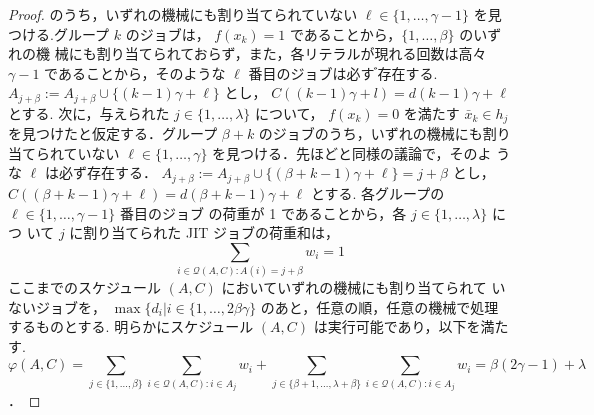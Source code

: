 \documentclass[12pt]{optlab-bachelor}
\begin{document}
\begin{proof}
  のうち，いずれの機械にも割り当てられていない $\ell \in
  \{1,\ldots,\gamma - 1\}$ を見つける.グループ $k$ のジョブは，
  $f (x_k) = 1$ であることから，$\{1,\ldots, \beta \}$ のいずれの機
  械にも割り当てられておらず，また，各リテラルが現れる回数は高々
  $\gamma − 1$ であることから，そのような $\ell$ 番目のジョブは必す
  ゙存在する. $A_{j + \beta} := A_{j + \beta} \cup \{ (k − 1) \gamma +
  \ell\}$ とし， $C((k − 1)\gamma + l) = d(k−1)\gamma + \ell$ とする.
  次に，与えられた $j \in \{1,\ldots,\lambda\}$ について， $f(x_k) = 0$
  を満たす $\bar x_k \in h_j$ を見つけたと仮定する．グループ $\beta
  + k$ のジョブのうち，いずれの機械にも割り当てられていない $\ell
  \in \{1,\ldots,\gamma\}$ を見つける．先ほどと同様の議論で，そのよ
  うな $\ell$ は必ず存在する． $A_{j + \beta} := A_{j + \beta} \cup \{
  (\beta + k − 1 ) \gamma + \ell \} = j + \beta$ とし，$C((\beta + k −
  1) \gamma + \ell) = d(\beta + k − 1)\gamma + \ell$ とする.
  各グループの $\ell \in \{1,\ldots,\gamma − 1\}$ 番目のジョブ
  の荷重が 1 であることから，各 $j \in \{1,\ldots, \lambda \}$ につ
  いて $j$ に割り当てられた JIT ジョブの荷重和は，
  $$\displaystyle \sum_{i \in \mathcal{Q}(A,C):A(i) = j + \beta}w_i =
  1$$
  ここまでのスケジュール $(A, C)$ においていずれの機械にも割り当てられて
  いないジョブを， $\max\{d_i | i \in \{1,\ldots, 2\beta \gamma\}$ のあと，任意の順，任意の機械で処理するものとする.
  明らかにスケジュール $(A, C)$ は実行可能であり，以下を満たす.
  $$\displaystyle \varphi(A,C) = \sum_{j \in
      \{1,\ldots,\beta\}} \sum_{i \in \mathcal{Q}(A,C):i \in
      A_j}w_i + \sum_{j \in
      \{\beta + 1,\ldots,\lambda + \beta\}} \sum_{i \in \mathcal{Q}(A,C):i \in
      A_j}w_i =
    \beta(2\gamma - 1) + \lambda$$．
\end{proof}
\end{document}
